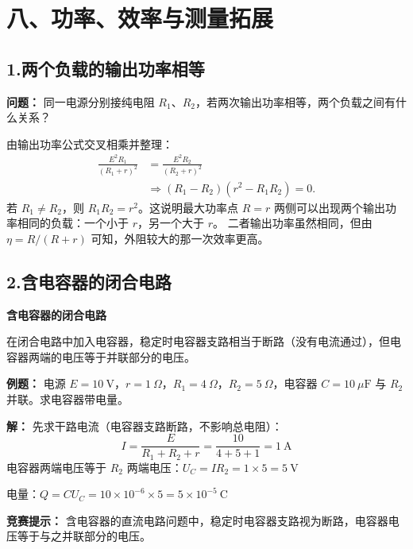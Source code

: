 \section*{八、功率、效率与测量拓展}

\subsection*{1.\quad 两个负载的输出功率相等}

\begin{competitionbox}
\textbf{问题：} 同一电源分别接纯电阻 $R_1$、$R_2$，若两次输出功率相等，两个负载之间有什么关系？

由输出功率公式交叉相乘并整理：
\[
\begin{aligned}
\frac{E^2R_1}{(R_1+r)^2}
  &=\frac{E^2R_2}{(R_2+r)^2}\\
  &\Longrightarrow (R_1-R_2)(r^2-R_1R_2)=0.
\end{aligned}
\]
若 $R_1\ne R_2$，则 $\boxed{R_1R_2=r^2}$。这说明最大功率点 $R=r$
两侧可以出现两个输出功率相同的负载：一个小于 $r$，另一个大于 $r$。
二者输出功率虽然相同，但由 $\eta=R/(R+r)$ 可知，外阻较大的那一次效率更高。
\end{competitionbox}

\subsection*{2.\quad 含电容器的闭合电路}

\begin{competitionbox}
\textbf{含电容器的闭合电路}

在闭合电路中加入电容器，稳定时电容器支路相当于断路（没有电流通过），但电容器两端的电压等于并联部分的电压。

\begin{center}


\label{fig:capacitor-closed-circuit}
\end{center}

\textbf{例题：} 电源 $E = 10\ \mathrm{V}$，$r = 1\ \Omega$，$R_1 = 4\ \Omega$，$R_2 = 5\ \Omega$，电容器 $C = 10\ \mu\mathrm{F}$ 与 $R_2$ 并联。求电容器带电量。

\textbf{解：} 先求干路电流（电容器支路断路，不影响总电阻）：
\[
I = \frac{E}{R_1 + R_2 + r} = \frac{10}{4 + 5 + 1} = 1\ \mathrm{A}
\]
电容器两端电压等于 $R_2$ 两端电压：$U_C = IR_2 = 1 \times 5 = 5\ \mathrm{V}$

电量：$Q = CU_C = 10 \times 10^{-6} \times 5 = 5 \times 10^{-5}\ \mathrm{C}$

\textbf{竞赛提示：} 含电容器的直流电路问题中，稳定时电容器支路视为断路，电容器电压等于与之并联部分的电压。
\end{competitionbox}

